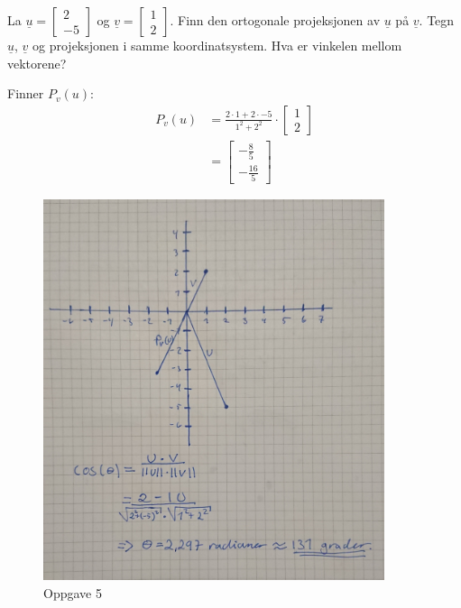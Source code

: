 \documentclass[11pt, a4paper, norsk]{NTNUoving}
\begin{document}
   \begin{oppgave}
       La $\underline{u} = \begin{bmatrix}
           2 \\
           -5
       \end{bmatrix}$ og $\underline{v} = \begin{bmatrix}
           1 \\
           2
       \end{bmatrix}$. Finn den ortogonale projeksjonen av $\underline{u}$ på $\underline{v}$. Tegn $\underline{u}$, $\underline{v}$ og projeksjonen i samme koordinatsystem. Hva er vinkelen mellom vektorene?

       Finner $P_{v}(u)$:
       \begin{align*}
           P_{v}(u) &= \frac{2 \cdot 1 + 2 \cdot -5}{1^2 + 2^2} \cdot \begin{bmatrix}
               1 \\
               2
           \end{bmatrix} \\
                    &= \begin{bmatrix}
                        -\frac{8}{5} \\
                        -\frac{16}{5}
                    \end{bmatrix}
       \end{align*}
       \begin{figure}[!ht]
           \centering
           \includegraphics[width=10cm]{oppgave_5.JPG}
           \caption{Oppgave 5}
           \label{fig:oppgave5}
       \end{figure}
       \FloatBarrier
   \end{oppgave}
\end{document}
